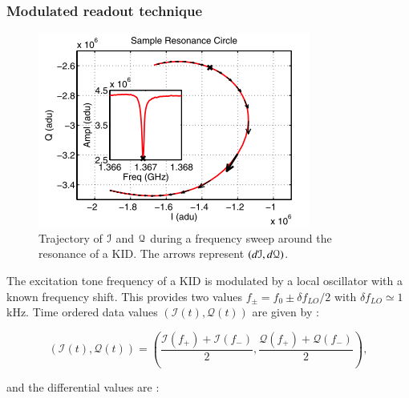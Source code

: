 
\subsubsection{Modulated readout technique}

\begin{figure}
  \includegraphics[clip,angle=0,width=\columnwidth]{Figures/resonance-circle.png}
  \caption{Trajectory of $\mathcal{I}$ and $\mathcal{Q}$ during a frequency sweep around the
    resonance of a KID. The arrows represent $(d\mathcal{I},
    d\mathcal{Q})$. \citep{2013A&A...551L..12C}}
  \label{circle-iq}
\end{figure}

The excitation tone frequency of a KID is modulated by a local oscillator with a
known frequency shift. This provides two values $f_{\pm} = f_0 \pm \delta
  f_{LO}/2$ with $\delta f_{LO} \simeq 1$\,kHz. Time ordered data values $(\mathcal{I}(t),\mathcal{Q}(t))$ are given by :

\begin{equation}
(\mathcal{I}(t), \mathcal{Q}(t)) = (\frac{\mathcal{I}(f_{+}) +
    \mathcal{I}(f_{-})}{2},
\frac{\mathcal{Q}(f_{+}) + \mathcal{Q}(f_{-})}{2}),
\end{equation}

and the differential values are :


